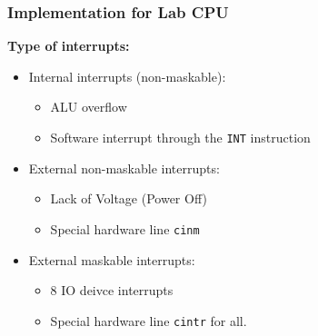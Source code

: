 \begin{frame}
    \frametitle{Implementation for Lab CPU}
    \textbf{Type of interrupts:}
    \begin{itemize}
        \item Internal interrupts (non-maskable):
        \begin{itemize}
            \item ALU overflow
            \item Software interrupt through the \texttt{INT} instruction
        \end{itemize}
        \item External non-maskable interrupts:
        \begin{itemize}
            \item Lack of Voltage (Power Off)
            \item Special hardware line \texttt{cinm}
        \end{itemize}
        \item External maskable interrupts:
        \begin{itemize}
            \item 8 IO deivce interrupts
            \item Special hardware line \texttt{cintr} for all.
        \end{itemize}
    \end{itemize}
\end{frame}

